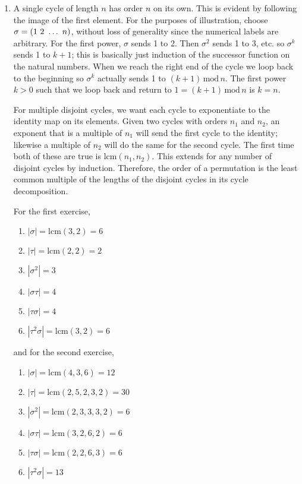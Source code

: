\documentclass[]{article}
\newcommand{\abs}[1]{\left\vert #1 \right\vert}
\newcommand{\md}{\,\text{mod}\,}
\newcommand*{\cycle}[1]{( \foreach \entry [count=\i] in {#1} {\ifnum\i>1\ \fi\entry})}
\begin{document}
\begin{enumerate}
\item A single cycle of length $n$ has order $n$ on its own. This is evident by following the image  of the first element. For the purposes of illustration, choose $\sigma = \cycle{1,2,\ldots,n}$, without loss of generality since the numerical labels are arbitrary. For the first power, $\sigma$ sends 1 to 2. Then $\sigma^2$ sends 1 to 3, etc. so $\sigma^k$ sends 1 to $k+1$; this is basically just induction of the successor function on the natural numbers. When we reach the right end of the cycle we loop back to the beginning so $\sigma^k$ actually sends 1 to $(k+1)\md n$. The first power $k>0$ such that we loop back and return to $1 = (k+1)\md n$ is $k=n$. 

For multiple disjoint cycles, we want each cycle to exponentiate to the identity map on its elements. Given two cycles with orders $n_1$ and $n_2$, an exponent that is a multiple of $n_1$ will send the first cycle to the identity; likewise a multiple of $n_2$ will do the same for the second cycle. The first time both of these are true is $\text{lcm}(n_1,n_2)$. This extends for any number of disjoint cycles by induction. Therefore, the order of a permutation is the least common multiple of the lengths of the disjoint cycles in its cycle decomposition.

For the first exercise,
\begin{enumerate}
\item $\abs{\sigma} = \text{lcm}(3,2) = 6$
\item $\abs{\tau} = \text{lcm}(2,2) = 2$
\item $\abs{\sigma^2} = 3$
\item $\abs{\sigma\tau} = 4$
\item $\abs{\tau\sigma} = 4$
\item $\abs{\tau^2\sigma} = \text{lcm}(3,2) = 6$
\end{enumerate}
and for the second exercise,
\begin{enumerate}
\item $\abs{\sigma} = \text{lcm}(4,3,6) = 12$
\item $\abs{\tau} = \text{lcm}(2,5,2,3,2) = 30$
\item $\abs{\sigma^2} = \text{lcm}(2,3,3,3,2) = 6$
\item $\abs{\sigma\tau} = \text{lcm}(3,2,6,2) = 6$
\item $\abs{\tau\sigma} = \text{lcm}(2,2,6,3) = 6$
\item $\abs{\tau^2\sigma} = 13$
\end{enumerate}



\end{enumerate}
\end{document}
